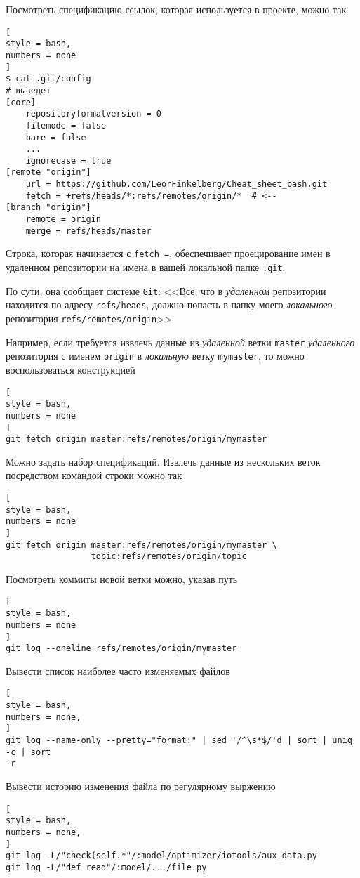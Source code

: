 \documentclass[%
	11pt,
	a4paper,
	utf8,
		]{article}
\begin{document}
Посмотреть спецификацию ссылок, которая используется в проекте, можно так
\begin{lstlisting}[
style = bash,
numbers = none
]
$ cat .git/config
# выведет
[core]
    repositoryformatversion = 0
    filemode = false
    bare = false
    ...
    ignorecase = true
[remote "origin"]
    url = https://github.com/LeorFinkelberg/Cheat_sheet_bash.git
    fetch = +refs/heads/*:refs/remotes/origin/*  # <--
[branch "origin"]
    remote = origin
    merge = refs/heads/master
\end{lstlisting}

Строка, которая начинается с \texttt{fetch =}, обеспечивает проецирование имен в удаленном репозитории на имена в вашей локальной папке \texttt{.git}.

По сути, она сообщает системе \texttt{Git}: <<Все, что в \emph{удаленном} репозитории находится по адресу \verb|refs/heads|, должно попасть в папку моего \emph{локального} репозитория \verb|refs/remotes/origin|>>

Например, если требуется извлечь данные из \emph{удаленной} ветки \texttt{master} \emph{удаленного} репозитория с именем \texttt{origin} в \emph{локальную} ветку \texttt{mymaster}, то можно воспользоваться конструкцией
\begin{lstlisting}[
style = bash,
numbers = none
]
git fetch origin master:refs/remotes/origin/mymaster
\end{lstlisting}

Можно задать набор спецификаций. Извлечь данные из нескольких веток посредством командой строки можно так
\begin{lstlisting}[
style = bash,
numbers = none
]
git fetch origin master:refs/remotes/origin/mymaster \
                 topic:refs/remotes/origin/topic
\end{lstlisting}

Посмотреть коммиты новой ветки можно, указав путь 
\begin{lstlisting}[
style = bash,
numbers = none
]
git log --oneline refs/remotes/origin/mymaster
\end{lstlisting}

Вывести список наиболее часто изменяемых файлов
\begin{lstlisting}[
style = bash,
numbers = none,
]
git log --name-only --pretty="format:" | sed '/^\s*$/'d | sort | uniq -c | sort
-r
\end{lstlisting}

Вывести историю изменения файла по регулярному выржению
\begin{lstlisting}[
style = bash,
numbers = none,
]
git log -L/"check(self.*"/:model/optimizer/iotools/aux_data.py
git log -L/"def read"/:model/.../file.py
\end{lstlisting}
\end{document}
